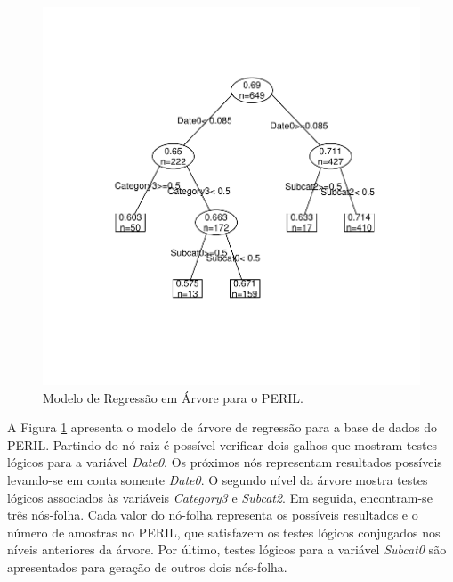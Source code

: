 \begin{figure}[h]
  \centering
  \includegraphics[trim = 1mm 30mm 1mm 1mm,clip,width=\columnwidth]{image/regressiontreemodel.pdf}
  \caption{Modelo de Regressão em Árvore para o PERIL.}
  \label{fig:rtm}
\end{figure}

A Figura \ref{fig:rtm} apresenta o modelo de árvore de regressão para a base de dados do PERIL. Partindo do nó-raiz é possível verificar dois galhos que mostram testes lógicos para a variável \textit{Date0}. Os próximos nós representam resultados possíveis levando-se em conta somente \textit{Date0}. O segundo nível da árvore mostra testes lógicos associados às variáveis \textit{Category3} e \textit{Subcat2}. Em seguida, encontram-se três nós-folha. Cada valor do nó-folha representa os possíveis resultados e o número de amostras no PERIL, que satisfazem os testes lógicos conjugados nos níveis anteriores da árvore. Por último, testes lógicos para a variável \textit{Subcat0} são apresentados para geração de outros dois nós-folha.

